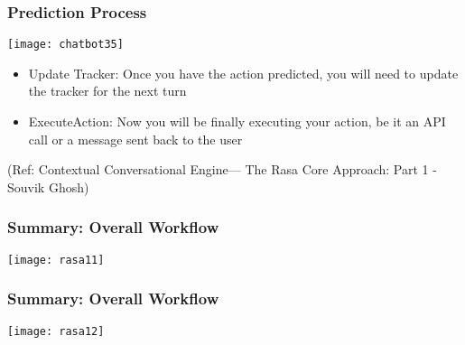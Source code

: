  \begin{frame}[fragile]\frametitle{Prediction Process}
 

\begin{center}
\texttt{[image: chatbot35]}

\end{center}

\begin{itemize}
\item Update Tracker: Once you have the action predicted, you will need to update the tracker for the next turn
\item ExecuteAction: Now you will be finally executing your action, be it an API call or a message sent back to the user
\end{itemize}


\tiny{(Ref: Contextual Conversational Engine— The Rasa Core Approach: Part 1 - Souvik Ghosh)}

\end{frame}




\begin{frame}[fragile]\frametitle{Summary: Overall Workflow}


\begin{center}
\texttt{[image: rasa11]}
\end{center}


\end{frame}

\begin{frame}[fragile]\frametitle{Summary: Overall Workflow}


\begin{center}
\texttt{[image: rasa12]}
\end{center}


\end{frame}

